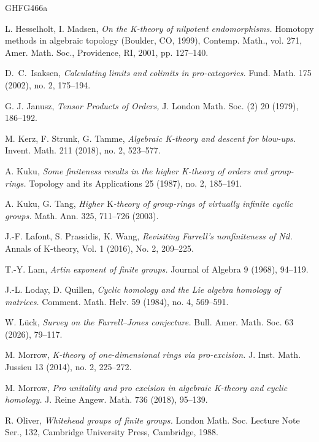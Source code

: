 \documentclass[reqno,11pt,letterpaper]{amsart}
\theoremstyle{plain}
\numberwithin{equation}{subsection}
\theoremstyle{remark}
\theoremstyle{plain}
\theoremstyle{definition}\newtheorem*{notation}{Notation}
\newcommand{\RK}{\mathrm{K}}
\begin{document}
\begin{thebibliography}{GHFG466a}
 

  L. Hesselholt, I. Madsen, \emph{On the K-theory of nilpotent endomorphisms.} Homotopy methods
in algebraic topology (Boulder, CO, 1999), Contemp. Math., vol. 271, Amer.
Math. Soc., Providence, RI, 2001, pp. 127--140.

 D.~C.~Isaksen, \emph{Calculating limits and colimits in pro-categories.}
Fund. Math. 175 (2002), no. 2, 175--194.

 G. J. Janusz, \emph{Tensor Products of Orders,} J. London Math. Soc. (2) 20 (1979), 186--192.

 M. Kerz, F. Strunk, G. Tamme, \emph{Algebraic  K-theory and descent for blow-ups.}
Invent. Math. 211 (2018), no. 2, 523--577.

 

 A. Kuku, \emph{Some finiteness results in the higher K-theory of orders and group-rings.}
 Topology and its Applications 25 (1987), no. 2, 185--191.

 A. Kuku, G. Tang, \textit{Higher $\RK$-theory of group-rings of virtually infinite
cyclic groups.} Math. Ann. 325, 711--726 (2003). 

 J.-F. Lafont, S. Prassidis, K. Wang, \textit{Revisiting Farrell's nonfiniteness of Nil.} 
Annals of $\RK$-theory, Vol. 1 (2016), No. 2, 209--225.
 
  T.-Y. Lam, \emph{Artin exponent of finite groups.} Journal of Algebra 9 (1968), 94--119. 


 

 J.-L. Loday, D. Quillen, \textit{Cyclic homology and the Lie algebra homology of matrices.}
Comment. Math. Helv. 59 (1984), no. 4, 569--591.

 W. L\"uck, \textit{Survey on the Farrell--Jones conjecture.}
Bull. Amer. Math. Soc. 63 (2026), 79--117.

 

 M.  Morrow, \textit{K-theory of one-dimensional rings via pro-excision.} J. Inst. Math. Jussieu 13 (2014), no. 2, 225--272. 

 M.  Morrow, \textit{Pro unitality and pro excision in algebraic K-theory and cyclic homology.} J. Reine Angew. Math. 736 (2018), 95--139.

 

 R. Oliver, \textit{Whitehead groups of finite groups.} London Math. Soc. Lecture Note Ser., 132,
Cambridge University Press, Cambridge, 1988. 


\end{thebibliography}
\end{document}
